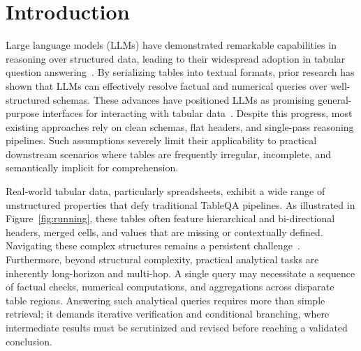 \documentclass{article}
\theoremstyle{plain}
\theoremstyle{definition}
\theoremstyle{remark}
\begin{document}
\section{Introduction}
Large language models (LLMs) have demonstrated remarkable capabilities in reasoning over structured data, leading to their widespread adoption in tabular question answering~\cite{gong2020tablegpt, zhao-etal-2024-tapera,katsis2022ait}. By serializing tables into textual formats, prior research has shown that LLMs can effectively resolve factual and numerical queries over well-structured schemas. These advances have positioned LLMs as promising general-purpose interfaces for interacting with tabular data~\cite{ren2025deep, somvanshi2024survey}. Despite this progress, most existing approaches rely on clean schemas, flat headers, and single-pass reasoning pipelines. Such assumptions severely limit their applicability to practical downstream scenarios where tables are frequently irregular, incomplete, and semantically implicit for comprehension.

Real-world tabular data, particularly spreadsheets, exhibit a wide range of unstructured properties that defy traditional TableQA pipelines. As illustrated in Figure~\ref{fig:running}, these tables often feature hierarchical and bi-directional headers, merged cells, and values that are missing or contextually defined. Navigating these complex structures remains a persistent challenge~\cite{tang2025st, wu2025realhitbench}. Furthermore, beyond structural complexity, practical analytical tasks are inherently long-horizon and multi-hop. A single query may necessitate a sequence of factual checks, numerical computations, and aggregations across disparate table regions. Answering such analytical queries requires more than simple retrieval; it demands iterative verification and conditional branching, where intermediate results must be scrutinized and revised before reaching a validated conclusion.
\end{document}
